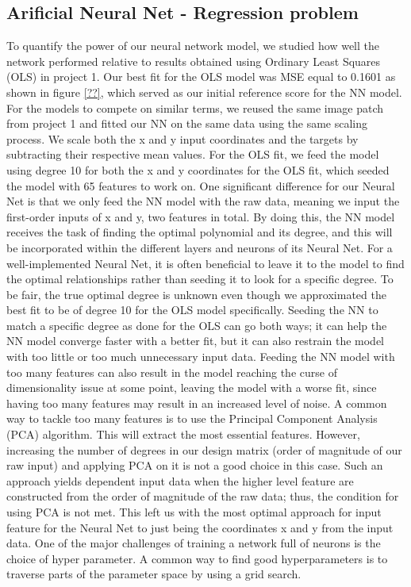 \documentclass
[twocolumn,
secnumarabic,
nobibnotes,
aps,
prl,
reprint,
groupedaddress,
amsmath,
amssymb
]{revtex4-2}
\begin{document}
\subsection{Arificial Neural Net - Regression problem}
To quantify the power of our neural network model, we studied how well the network performed relative to results obtained using Ordinary Least Squares (OLS) in project 1. Our best fit for the OLS model was MSE equal to 0.1601 as shown in figure \ref{??}, which served as our initial reference score for the NN model. For the models to compete on similar terms, we reused the same image patch from project 1 and fitted our NN on the same data using the same scaling process. We scale both the x and y input coordinates and the targets by subtracting their respective mean values. For the OLS fit, we feed the model using degree 10 for both the x and y coordinates for the OLS fit, which seeded the model with 65 features to work on. One significant difference for our Neural Net is that we only feed the NN model with the raw data, meaning we input the first-order inputs of x and y, two features in total. By doing this, the NN model receives the task of finding the optimal polynomial and its degree, and this will be incorporated within the different layers and neurons of its Neural Net. For a well-implemented Neural Net, it is often beneficial to leave it to the model to find the optimal relationships rather than seeding it to look for a specific degree. To be fair, the true optimal degree is unknown even though we approximated the best fit to be of degree 10 for the OLS model specifically. Seeding the NN to match a specific degree as done for the OLS can go both ways; it can help the NN model converge faster with a better fit, but it can also restrain the model with too little or too much unnecessary input data. Feeding the NN model with too many features can also result in the model reaching the curse of dimensionality issue at some point, leaving the model with a worse fit, since having too many features may result in an increased level of noise. A common way to tackle too many features is to use the Principal Component Analysis (PCA) algorithm. This will extract the most essential features. However, increasing the number of degrees in our design matrix (order of magnitude of our raw input) and applying PCA on it is not a good choice in this case. Such an approach yields dependent input data when the higher level feature are constructed from the order of magnitude of the raw data; thus, the condition for using PCA is not met. This left us with the most optimal approach for input feature for the Neural Net to just being the coordinates x and y from the input data. One of the major challenges of training a network full of neurons is the choice of hyper parameter. A common way to find good hyperparameters is to traverse parts of the parameter space by using a grid search.
\end{document}
